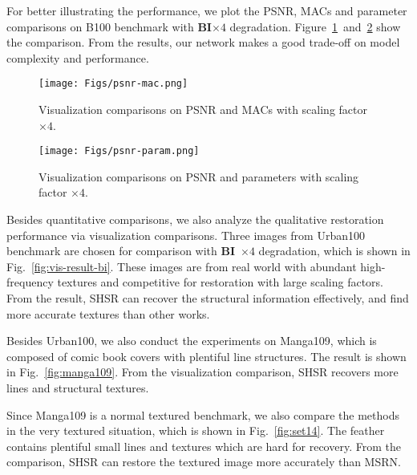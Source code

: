 \documentclass[manuscript,screen]{acmart}
\begin{document}
For better illustrating the performance, we plot the PSNR, MACs and parameter comparisons on B100 benchmark with \textbf{BI}$\times4$ degradation. Figure~\ref{fig:psnr-mac}~and~\ref{fig:psnr-param} show the comparison. From the results, our network makes a good trade-off on model complexity and performance.

\begin{figure}[t]
	\centering
	\texttt{[image: Figs/psnr-mac.png]}
	\caption{Visualization comparisons on PSNR and MACs with scaling factor $\times4$.}
	\label{fig:psnr-mac}
\end{figure}

\begin{figure}[t]
	\centering
	\texttt{[image: Figs/psnr-param.png]}
	\caption{Visualization comparisons on PSNR and parameters with scaling factor $\times4$.}
	\label{fig:psnr-param}
\end{figure}





Besides quantitative comparisons, we also analyze the qualitative restoration performance via visualization comparisons. Three images from Urban100 benchmark are chosen for comparison with \textbf{BI}~$\times4$ degradation, which is shown in Fig.~\ref{fig:vis-result-bi}. These images are from real world with abundant high-frequency textures and competitive for restoration with large scaling factors. From the result, SHSR can recover the structural information effectively, and find more accurate textures than other works.

Besides Urban100, we also conduct the experiments on Manga109, which is composed of comic book covers with plentiful line structures. The result is shown in Fig.~\ref{fig:manga109}. From the visualization comparison, SHSR recovers more lines and structural textures.

Since Manga109 is a normal textured benchmark, we also compare the methods in the very textured situation, which is shown in Fig.~\ref{fig:set14}. The feather contains plentiful small lines and textures which are hard for recovery. From the comparison, SHSR can restore the textured image more accurately than MSRN.
\end{document}
